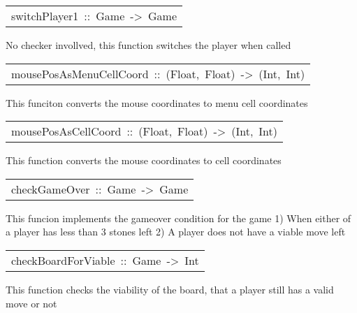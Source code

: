 \begin{haddockdesc}
\item[\begin{tabular}{@{}l}
switchPlayer1\ ::\ Game\ ->\ Game
\end{tabular}]\haddockbegindoc
{}
 No checker invollved, this function switches the player when called\par

\end{haddockdesc}
\begin{haddockdesc}
\item[\begin{tabular}{@{}l}
mousePosAsMenuCellCoord\ ::\ (Float,\ Float)\ ->\ (Int,\ Int)
\end{tabular}]\haddockbegindoc
{}
 This funciton converts the mouse coordinates to menu cell coordinates\par

\end{haddockdesc}
\begin{haddockdesc}
\item[\begin{tabular}{@{}l}
mousePosAsCellCoord\ ::\ (Float,\ Float)\ ->\ (Int,\ Int)
\end{tabular}]\haddockbegindoc
{}
 This function converts the mouse coordinates to cell coordinates\par

\end{haddockdesc}
\begin{haddockdesc}
\item[\begin{tabular}{@{}l}
checkGameOver\ ::\ Game\ ->\ Game
\end{tabular}]\haddockbegindoc
{}
 This funcion implements the gameover condition for the game
 1) When either of a player has less than 3 stones left
 2) A player does not have a viable move left\par

\end{haddockdesc}
\begin{haddockdesc}
\item[\begin{tabular}{@{}l}
checkBoardForViable\ ::\ Game\ ->\ Int
\end{tabular}]\haddockbegindoc
{}
 This function checks the viability of the board, that a player still has a valid move or not\par

\end{haddockdesc}
